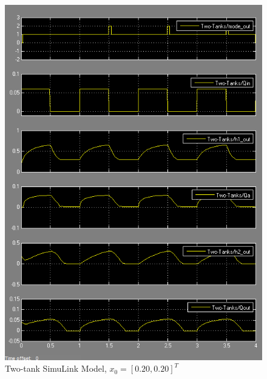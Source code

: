 \documentclass{article}
\begin{document}
\begin{figure}[h!]
\centering
\includegraphics[scale=0.7]{hw8_20_20.png}
\caption{Two-tank SimuLink Model, $x_0 = [0.20, 0.20]^T$ }
\label{fig:two-tank-model-20-20}
\end{figure}
\end{document}
